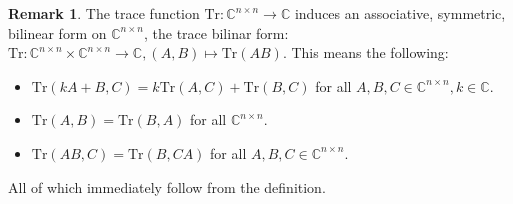 \documentclass{article}
\def\C{\mathbb{C}}
\def\Tr{\text{Tr}}
\theoremstyle{definition}
\newtheorem{rem}[Satz]{Remark}
\begin{document}
\begin{rem}
The trace function $\Tr : \C^{n \times n} \rightarrow \C$ induces an associative, symmetric, bilinear form on $\C^{n \times n}$, the trace bilinar form: $ \Tr: \C^{n \times n} \times \C^{n \times n} \rightarrow \C, (A,B) \mapsto \Tr(AB)$. This means the following:
\begin{itemize}
\item $\Tr(k A + B, C) = k \Tr(A,C) + \Tr(B,C)$ for all $A,B,C \in \C^{n \times n}, k \in \C$.
\item $\Tr(A,B) = \Tr(B,A)$ for all $\C^{n \times n}$.
\item $\Tr(AB,C) = \Tr(B,CA)$ for all $A,B,C \in \C^{n \times n}$.
\end{itemize}

All of which immediately follow from the definition.
\end{rem}
\end{document}

